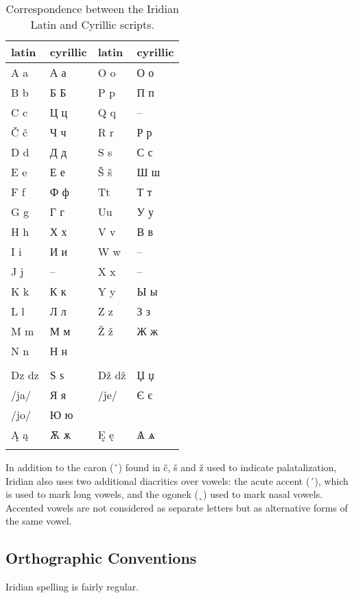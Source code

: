\begin{table}[h]
	\footnotesize\sffamily
 	\caption{Correspondence between the Iridian Latin and Cyrillic scripts.}
	\medskip
	\begin{tabu}to 0.8 
		\toprule
		{{\sc  latin}} & {\sc cyrillic} & {{\sc  latin}} & {\sc cyrillic} \\
		\midrule\addlinespace
		A a 		& А а	& O o   & О о \\ 
		B b			& Б Б 	& P p 	& П п \\
		C c 		& Ц ц 	& Q q 	& -- \\
		Č č 		& Ч ч 	& R r 	& Р р \\
		D d 		& Д д	& S s 	& С с \\
		E e 		& Е е 	& Š š 	& Ш ш \\
		F f			& Ф ф	& Tt 	& Т т \\
		G g 		& Г г	& Uu	& У у \\
		H h			& Х х	& V v   & В в\\
		I i			& И и	& W w   & --\\
		J j			& --	& X x   & --\\
		K k			& К к	& Y y   & Ы ы\\
		L l			& Л л   & Z z   & З з\\
		M m 		& М м   & Ž ž   & Ж ж\\
		N n 		& Н н   &&\\\addlinespace
		\\\addlinespace
		Dz dz 		& Ѕ ѕ 	& Dž dž & Џ џ\\
		/ja/ 		& Я я	&/je/ & Є є\\
		/jo/		& Ю ю   & &\\
		\k{A} \k{a} & Ѫ ѫ&\k{E} \k{e}&Ѧ ѧ\\ \addlinespace
		\bottomrule
	\end{tabu}
\end{table}
 
In addition to the caron (ˇ) found in č, š and ž used to indicate palatalization, Iridian also uses two additional diacritics over vowels: the acute accent (´), which is used to mark long vowels, and the ogonek (˛) used to mark nasal vowels. Accented vowels are not considered as separate letters but as alternative forms of the same vowel.

\subsection{Orthographic Conventions}
Iridian spelling is fairly regular.

